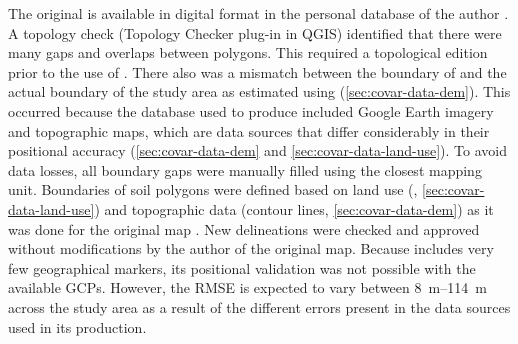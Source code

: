 
The original \soilNew{} is available in digital format in the personal database of the author 
\cite{Miguel2010}. A topology check (Topology Checker plug-in in QGIS) identified that there were many gaps 
and overlaps between polygons. This required a topological edition prior to the use of \soilNew{}. There also 
was a mismatch between the boundary of \soilNew{} and the actual boundary of the study area as estimated using 
\demNew{} (\autoref{sec:covar-data-dem}). This occurred because the database used to produce \soilNew{} 
included Google Earth imagery and topographic maps, which are data sources that differ 
considerably in their positional accuracy (\autoref{sec:covar-data-dem} and \autoref{sec:covar-data-land-use}). 
To avoid data losses, all boundary gaps were manually filled using the closest mapping unit. Boundaries of soil 
polygons were defined based on land use (\landNew{}, \autoref{sec:covar-data-land-use}) and topographic data 
(contour lines, \autoref{sec:covar-data-dem}) as it was done for the original map \cite{Miguel2010}. New 
delineations were checked and approved without modifications by the author of the original map. Because 
\soilNew{} includes very few geographical markers, its positional validation was not possible with the 
available GCPs. However, the RMSE is expected to vary between \SIrange{8}{114}{\m} across the study area as a 
result of the different errors present in the data sources used in its production.

